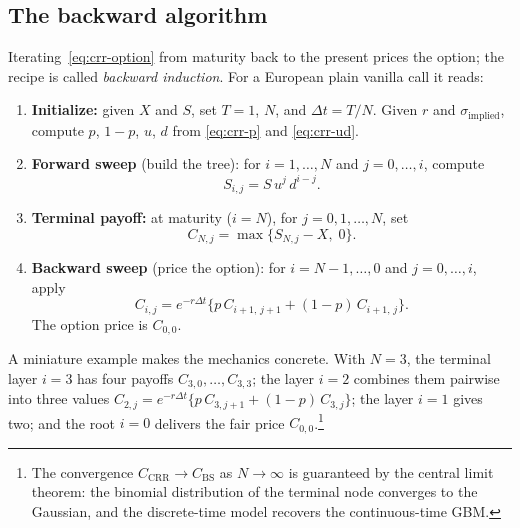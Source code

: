 \subsection{The backward algorithm}\label{sec:crr-algorithm}

Iterating~\eqref{eq:crr-option} from maturity back to the present prices the option; the recipe is called \emph{backward induction}.
For a European plain vanilla call it reads:

\begin{enumerate}[label=\alph*)]
    \item \textbf{Initialize:} given $X$ and $S$, set $T=1$, $N$, and $\Delta t = T/N$.
    Given $r$ and $\sigma_{\text{implied}}$, compute $p$, $1-p$, $u$, $d$ from \eqref{eq:crr-p} and \eqref{eq:crr-ud}.

    \item \textbf{Forward sweep} (build the tree):
    for $i=1,\ldots,N$ and $j=0,\ldots,i$, compute
    \begin{equation}
    S_{i,j} = S\, u^j\, d^{i-j}.
    \end{equation}

    \item \textbf{Terminal payoff:}
    at maturity ($i=N$), for $j=0,1,\ldots,N$, set
    \begin{equation}
    C_{N,j} = \max\{S_{N,j} - X,\; 0\}.
    \end{equation}

    \item \textbf{Backward sweep} (price the option):
    for $i=N-1,\ldots,0$ and $j=0,\ldots,i$, apply
    \begin{equation}
    C_{i,j} = e^{-r\Delta t}\bigl\{p\, C_{i+1,\,j+1} + (1-p)\, C_{i+1,\,j}\bigr\}.
    \end{equation}
    The option price is $C_{0,0}$.
\end{enumerate}

A miniature example makes the mechanics concrete.
With $N=3$, the terminal layer $i=3$ has four payoffs $C_{3,0},\ldots,C_{3,3}$; the layer $i=2$ combines them pairwise into three values $C_{2,j} = e^{-r\Delta t}\{p\, C_{3,j+1} + (1-p)\, C_{3,j}\}$; the layer $i=1$ gives two; and the root $i=0$ delivers the fair price $C_{0,0}$.\footnote{The convergence $C_{\text{CRR}} \to C_{\text{BS}}$ as $N\to\infty$ is guaranteed by the central limit theorem: the binomial distribution of the terminal node converges to the Gaussian, and the discrete-time model recovers the continuous-time GBM.}

